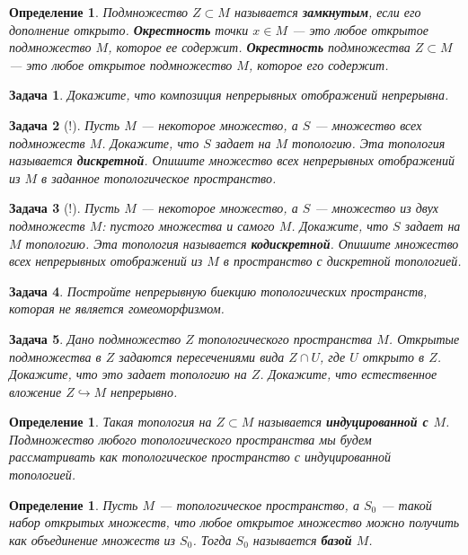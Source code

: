 \documentclass[12pt]{book}
\theoremstyle{upshape}
\newtheorem{zadacha}{Задача}[chapter]
\theoremstyle{generic}
\newtheorem{opredelenie}[teorema]{Определение}
\theoremstyle{upshapenonumber}
\newcommand{\следствие}{%
     \refstepcounter{teorema}
     {\noindent\bf Следствие \thechapter.\arabic{teorema}:\ }}
\newcommand{\пример}{%
     \refstepcounter{teorema}
     {\noindent\bf Пример \thechapter.\arabic{teorema}:\ }}
\newcommand{\лемма}{%
     \refstepcounter{teorema}
     {\noindent\bf Лемма \thechapter.\arabic{teorema}:\ }}
\newcommand{\теорема}{%
     \refstepcounter{teorema}
     {\noindent\bf Теорема \thechapter.\arabic{teorema}:\ }}
\newcommand{\утверждение}{%
     \refstepcounter{teorema}
     {\noindent\bf Утверждение \thechapter.\arabic{teorema}:\ }}
\begin{document}
{\begin{opredelenie}
Подмножество $Z\subset M$ называется {\bf замкнутым}, если его
дополнение открыто. {\bf Окрестность} точки $x\in M$ --- это любое
открытое подмножество $M$, которое ее содержит. {\bf Окрестность}
подмножества $Z\subset M$ --- это любое открытое подмножество $M$,
которое его содержит.
\end{opredelenie}

\begin{zadacha}
Докажите, что композиция непрерывных отображений
непрерывна.
\end{zadacha}

\begin{zadacha}[!]
Пусть $M$ --- некоторое множество, а $S$ --- множество всех
подмножеств $M$. Докажите, что $S$ задает на $M$ топологию. Эта
топология называется {\bf дискретной}. Опишите множество всех
непрерывных отображений из $M$ в заданное топологическое
пространство.
\end{zadacha}

\begin{zadacha}[!]
Пусть $M$ --- некоторое множество, а $S$ --- множество из двух
подмножеств $M$: пустого множества и самого $M$. Докажите, что $S$
задает на $M$ топологию.  Эта топология называется {\bf
кодискретной}. Опишите множество всех непрерывных отображений из $M$
в пространство с дискретной топологией.
\end{zadacha}

\begin{zadacha}
Постройте непрерывную биекцию топологических пространств, которая не
является гомеоморфизмом.
\end{zadacha}

\begin{zadacha} 
Дано подмножество $Z$ топологического пространства $M$.
Открытые подмножества в $Z$ задаются пересечениями вида
$Z\cap U$, где $U$ открыто в $Z$. 
Докажите, что это задает топологию на $Z$. Докажите, что
естественное вложение $Z\hookrightarrow M$ непрерывно.
\end{zadacha}

\begin{opredelenie}
Такая топология на $Z\subset M$ называется {\bf индуцированной с
$M$}. Подмножество любого топологического пространства мы будем
рассматривать как топологическое пространство с индуцированной
топологией.
\end{opredelenie}

\begin{opredelenie}
Пусть $M$ --- топологическое пространство, а $S_0$ --- такой набор
открытых множеств, что любое открытое множество можно получить как
объединение множеств из $S_0$. Тогда $S_0$ называется {\bf базой}
$M$.
\end{opredelenie}

}
\end{document}
